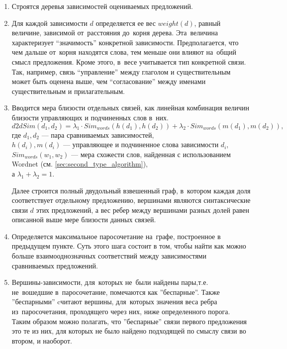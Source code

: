 \begin{enumerate}

\item {
Строятся деревья зависимостей оцениваемых предложений.
}

\item {
Для каждой зависимости $d$ определяется ее  вес $weight(d)$, равный величине,  
зависимой от~расстояния до~корня дерева.
Эта~величина характеризует ``значимость'' конкретной зависимости.
Предполагается, что чем дальше от~корня находятся слова, тем меньше они влияют на~общий смысл предложения. 
Кроме этого, в~весе учитывается тип конкретной связи.
Так, например, связь ``управление'' между глаголом и существительным 
может быть оценена выше, чем ``согласование'' между именами существительным и прилагательным.
}

\item{
Вводится мера близости отдельных связей, как линейная комбинация
величин близости управляющих и подчиненных слов в~них.
$$d2dSim(d_1,d_2) = \lambda_1 \cdot Sim_{words}(h(d_1),h(d_2)) + \lambda_2 \cdot Sim_{words}(m(d_1),m(d_2)), $$
где $d_1, d_2$ --- пара сравниваемых зависимостей,\\
$h(d_i), m(d_i)$ --- управляющее и подчиненное слова зависимости $d_i$,\\
$Sim_{words}(w_1,w_2)$ --- мера схожести слов, найденная с использованием Wordnet (см. \ref{sec:second_type_algorithm}),\\
а $\lambda_1 + \lambda_2 = 1$.

Далее строится полный двудольный взвешенный граф, в~котором каждая доля соответствует отдельному предложению,
вершинами являются синтаксические связи $d$ этих предложений,
а вес ребер между вершинами разных долей равен описанной выше мере близости
данных связей.
}

\item {
Определяется максимальное паросочетание на~графе,
построенное в предыдущем пункте.
Суть этого шага состоит в том, чтобы найти как можно
больше взаимооднозначных соответствий между зависимостями
сравниваемых предложений.
}

\item {
Вершины-зависимости, для~которых не~были найдены пары,т.е. не~вошедшие в~паросочетание, 
помечаются как ''беспарные''.
Также ''беспарными'' cчитают вершины,  для~которых значения веса ребра из~паросочетания, 
проходящего через них, ниже определенного порога.
Таким образом можно полагать, что ''беспарные'' связи первого предложения это те из них,
для которых не было найдено подходящей по смыслу связи во втором, и наоборот. 
}


\end{enumerate}
